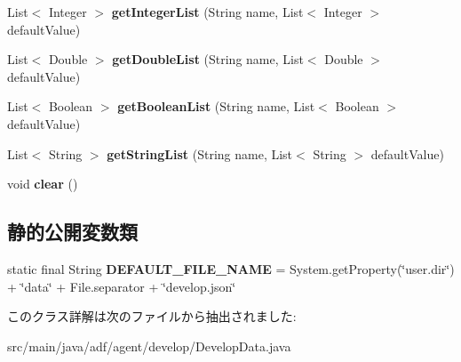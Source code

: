 \begin{DoxyCompactItemize}
List$<$ Integer $>$ {\bfseries get\+Integer\+List} (String name, List$<$ Integer $>$ default\+Value)
\item 
\hypertarget{classadf_1_1agent_1_1develop_1_1DevelopData_a20772951f2c49bbae32b285c23662221}{}\label{classadf_1_1agent_1_1develop_1_1DevelopData_a20772951f2c49bbae32b285c23662221} 
List$<$ Double $>$ {\bfseries get\+Double\+List} (String name, List$<$ Double $>$ default\+Value)
\item 
\hypertarget{classadf_1_1agent_1_1develop_1_1DevelopData_a94e976b28a65fbf8055e6283a31236cc}{}\label{classadf_1_1agent_1_1develop_1_1DevelopData_a94e976b28a65fbf8055e6283a31236cc} 
List$<$ Boolean $>$ {\bfseries get\+Boolean\+List} (String name, List$<$ Boolean $>$ default\+Value)
\item 
\hypertarget{classadf_1_1agent_1_1develop_1_1DevelopData_a5dd5fb6da9a779b77029a0135ce196aa}{}\label{classadf_1_1agent_1_1develop_1_1DevelopData_a5dd5fb6da9a779b77029a0135ce196aa} 
List$<$ String $>$ {\bfseries get\+String\+List} (String name, List$<$ String $>$ default\+Value)
\item 
\hypertarget{classadf_1_1agent_1_1develop_1_1DevelopData_a85d6ec19049355a23283aac6b93b4584}{}\label{classadf_1_1agent_1_1develop_1_1DevelopData_a85d6ec19049355a23283aac6b93b4584} 
void {\bfseries clear} ()
\end{DoxyCompactItemize}
\subsection*{静的公開変数類}
\begin{DoxyCompactItemize}
\item 
\hypertarget{classadf_1_1agent_1_1develop_1_1DevelopData_a854803523cdad900342fa22a3ba8efbb}{}\label{classadf_1_1agent_1_1develop_1_1DevelopData_a854803523cdad900342fa22a3ba8efbb} 
static final String {\bfseries D\+E\+F\+A\+U\+L\+T\+\_\+\+F\+I\+L\+E\+\_\+\+N\+A\+ME} = System.\+get\+Property(\char`\"{}user.\+dir\char`\"{}) + \char`\"{}data\char`\"{} + File.\+separator + \char`\"{}develop.\+json\char`\"{}
\end{DoxyCompactItemize}


このクラス詳解は次のファイルから抽出されました\+:\begin{DoxyCompactItemize}
\item 
src/main/java/adf/agent/develop/Develop\+Data.\+java\end{DoxyCompactItemize}
